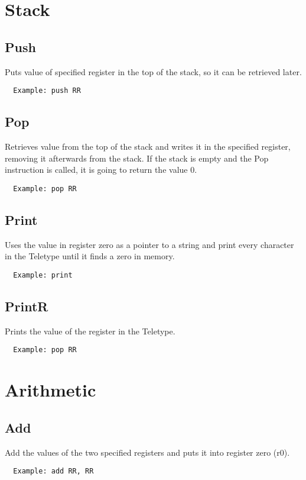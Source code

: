 \documentclass[oneside]{book}
\begin{document}
    \section{Stack}
  
   \subsection{Push}
  Puts value of specified register in the top of the stack, so it can be retrieved later.
  \begin{Verbatim}
  Example: push RR
  \end{Verbatim}
  
   \subsection{Pop}
  Retrieves value from the top of the stack and writes it in the specified register, removing it afterwards from the stack. If the stack is empty and the Pop instruction is called, it is going to return the value 0.
  \begin{Verbatim}
  Example: pop RR
  \end{Verbatim}
  
   \subsection{Print}
  Uses the value in register zero as a pointer to a string and print every character in the Teletype until it finds a zero in memory. 
  \begin{Verbatim}
  Example: print
  \end{Verbatim}
  
   \subsection{PrintR}
  Prints the value of the register in the Teletype.
  \begin{Verbatim}
  Example: pop RR
  \end{Verbatim}
  
    \section{Arithmetic}
  
   \subsection{Add}
  Add the values of the two specified registers and puts it into register zero (r0).
  \begin{Verbatim}
  Example: add RR, RR
  \end{Verbatim}
  
\end{document}
